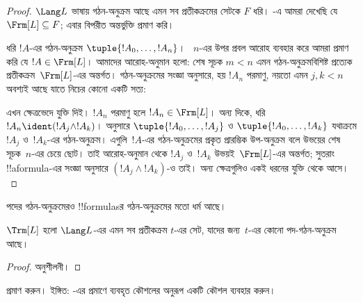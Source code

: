 \documentclass[../../../include/open-logic-section]{subfiles}
\begin{document}
\begin{proof}
$\Lang L$ ভাষায় গঠন-অনুক্রম আছে এমন সব প্রতীকক্রমের সেটকে $F$ ধরি।
-এ আমরা দেখেছি যে
$\Frm[L] \subseteq F$; এবার বিপরীত অন্তর্ভুক্তি প্রমাণ করি।

ধরি $!A$-এর গঠন-অনুক্রম $\tuple{!A_0,\dotsc,!A_n}$।
~$n$-এর উপর প্রবল আরোহ ব্যবহার করে আমরা প্রমাণ করি যে
$!A \in \Frm[L]$। আমাদের আরোহ-অনুমান হলো: শেষ সূচক $m < n$ এমন
গঠন-অনুক্রমবিশিষ্ট প্রত্যেক প্রতীকক্রম~$\Frm[L]$-এর অন্তর্গত।
গঠন-অনুক্রমের সংজ্ঞা অনুসারে, হয় $!A_n$ পরমাণু, নয়তো এমন $j,k < n$
অবশ্যই আছে যাতে নিচের কোনো একটি সত্য:
\begin{enumerate}
\end{enumerate}
এখন ক্ষেত্রভেদে যুক্তি দিই। $!A_n$ পরমাণু হলে
$!A_n \in \Frm[L]$। অন্য দিকে, ধরি $!A_n \ident
(!A_j \land !A_k)$।  অনুসারে
$\tuple{!A_0,\dotsc,!A_j}$ ও $\tuple{!A_0,\dotsc,!A_k}$ যথাক্রমে
$!A_j$ ও~$!A_k$-এর গঠন-অনুক্রম। এগুলি~$!A$-এর গঠন-অনুক্রমের প্রকৃত
প্রারম্ভিক উপ-অনুক্রম বলে উভয়ের শেষ সূচক~$n$-এর চেয়ে ছোট। তাই
আরোহ-অনুমান থেকে $!A_j$ ও~$!A_k$ উভয়ই~$\Frm[L]$-এর অন্তর্গত;
সুতরাং !!a{formula}-এর সংজ্ঞা অনুসারে
$(!A_j \land !A_k)$-ও তাই। অন্য ক্ষেত্রগুলিও একই ধরনের যুক্তি থেকে আসে।


\end{proof}

পদের গঠন-অনুক্রমেরও !!{formula}sর গঠন-অনুক্রমের মতো ধর্ম আছে।

\begin{prop}
$\Trm[L]$ হলো $\Lang L$-এর এমন সব প্রতীকক্রম $t$-এর সেট,
যাদের জন্য~$t$-এর কোনো পদ-গঠন-অনুক্রম আছে।
\end{prop}

\begin{proof}
অনুশীলনী।
\end{proof}

\begin{prob}
 প্রমাণ করুন।
ইঙ্গিত: -এর প্রমাণে ব্যবহৃত
কৌশলের অনুরূপ একটি কৌশল ব্যবহার করুন।
\end{prob}
\end{document}
